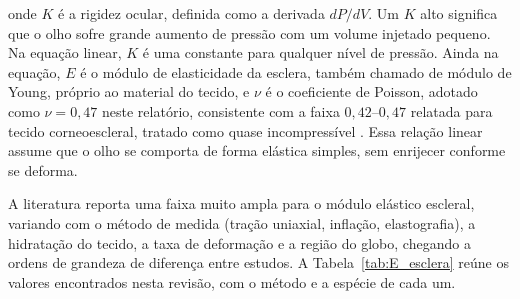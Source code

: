 onde $K$ é a rigidez ocular, definida como a derivada $dP/dV$. Um $K$ alto significa que o olho sofre grande aumento de pressão com um volume injetado pequeno. Na equação linear, $K$ é uma constante para qualquer nível de pressão. Ainda na equação, $E$ é o módulo de elasticidade da esclera, também chamado de módulo de Young, próprio ao material do tecido, e $\nu$ é o coeficiente de Poisson, adotado como $\nu=0{,}47$ neste relatório, consistente com a faixa $0{,}42$--$0{,}47$ relatada para tecido corneoescleral, tratado como quase incompressível \citep{aloy2017vibrational}. Essa relação linear assume que o olho se comporta de forma elástica simples, sem enrijecer conforme se deforma.

A literatura reporta uma faixa muito ampla para o módulo elástico escleral, variando com o método de medida (tração uniaxial, inflação, elastografia), a hidratação do tecido, a taxa de deformação e a região do globo, chegando a ordens de grandeza de diferença entre estudos. A Tabela~\ref{tab:E_esclera} reúne os valores encontrados nesta revisão, com o método e a espécie de cada um.
 
